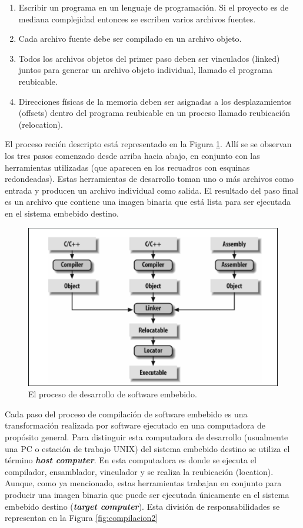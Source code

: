 \documentclass[output=paper, 
colorlinks,
citecolor=brown,
newtxmath
]{langscibook}
\begin{document}
\begin{enumerate}
\item Escribir un programa en un lenguaje de programación. Si el proyecto
es de mediana complejidad entonces se escriben varios archivos fuentes.
\item Cada archivo fuente debe ser compilado en un archivo objeto.
\item Todos los archivos objetos del primer paso deben ser vinculados (linked)
juntos para generar un archivo objeto individual, llamado el programa reubicable.
\item Direcciones físicas de la memoria deben ser asignadas a los desplazamientos (offsets)
dentro del programa reubicable en un proceso llamado reubicación (relocation).
\end{enumerate}


El proceso recién descripto está representado en la Figura \ref{fig:compilacion}.
Allí se se observan los tres pasos comenzado desde arriba hacia abajo,
en conjunto con las herramientas utilizadas (que aparecen
en los recuadros con esquinas redondeadas).
Estas herramientas de desarrollo toman uno o más archivos como entrada
y producen un archivo individual como salida. 
El resultado del paso final es un archivo que contiene una imagen binaria
que está lista para ser ejecutada en el sistema embebido destino.

\begin{figure}
\includegraphics[width=\linewidth]{images/ciclo_de_compilacion.png}
\caption{El proceso de desarrollo de software embebido.}
\label{fig:compilacion}
\end{figure}



Cada paso del proceso de compilación de software embebido
es una transformación realizada por software ejecutado en una computadora
de propósito general. Para distinguir esta computadora de desarrollo (usualmente una 
PC o estación de trabajo UNIX) del sistema embebido destino se utiliza el término \textit{\textbf{host computer}}.
En esta computadora es donde se ejecuta el compilador, ensamblador, vinculador y se realiza la reubicación (location).
Aunque, como ya mencionado, estas herramientas trabajan en conjunto
para producir una imagen binaria que puede ser ejecutada
únicamente en el sistema embebido destino (\textit{\textbf{target
computer}}). Esta división de responsabilidades
se representan en la Figura \ref{fig:compilacion2}
\end{document}
